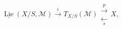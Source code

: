 \[
\underline{\operatorname{Lie}}(X/S,\mathcal M)
 \xrightarrow{\ i\ } T_{X/S}(\mathcal M)
 \mathrel{\substack{\xrightarrow{\ p\ }\\[-0.6em]\xleftarrow[\ s\ ]{}}}X,
\]
